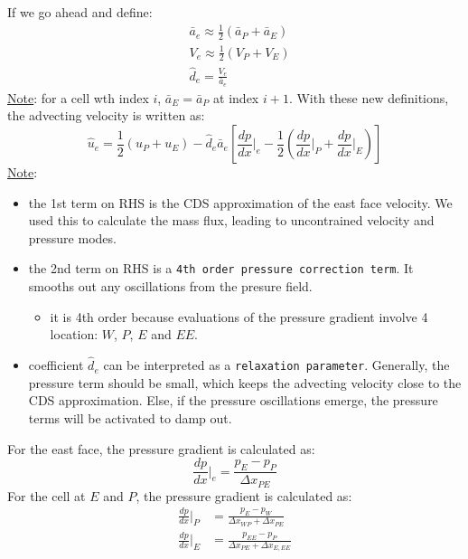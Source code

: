 \documentclass[11pt]{article}
\begin{document}
If we go ahead and define:
\begin{equation*}
\begin{aligned}
&\bar{a}_e \approx \frac{1}{2}(\bar{a}_P + \bar{a}_E)\\
&V_e \approx \frac{1}{2}(V_P + V_E)\\
& \hat{d}_e = \frac{V_e}{\bar{a}_e}
\end{aligned}
\end{equation*}
\uline{Note}: for a cell wth index \(i\), \(\bar{a}_E = \bar{a}_P\) at index \(i+1\). With these new definitions,
the advecting velocity is written as:
\begin{equation*}
\hat{u}_e = \frac{1}{2}(u_P + u_E)
- \hat{d}_e{\bar{a}_e}\left[ \frac{dp}{dx}\biggr\rvert_e -\frac{1}{2}
\left( \frac{dp}{dx}\biggr\rvert_P  + \frac{dp}{dx}\biggr\rvert_E  \right) \right]
\end{equation*}
\uline{Note}:
\begin{itemize}
\item the 1st term on RHS is the CDS approximation of the east face velocity. We used this to calculate the
mass flux, leading to uncontrained velocity and pressure modes.
\item the 2nd term on RHS is a \texttt{4th order pressure correction term}. It smooths out any oscillations from the
presure field. 
\begin{itemize}
\item it is 4th order because evaluations of the pressure gradient involve 4 location:
\(W\), \(P\), \(E\) and \(EE\).
\end{itemize}
\item coefficient \(\hat{d}_e\) can be interpreted as a \texttt{relaxation parameter}. Generally, the pressure term should be small,
which keeps the advecting velocity close to the CDS approximation. Else, if the pressure oscillations emerge, the
pressure terms will be activated to damp out.
\end{itemize}
For the east face, the pressure gradient is calculated as:
\begin{equation*}
\frac{dp}{dx}\biggr\rvert_e = \frac{p_E-p_P}{\Delta x_{PE}}
\end{equation*}
For the cell at \(E\) and \(P\), the pressure gradient is calculated as:
\begin{equation*}
\begin{aligned}
\frac{dp}{dx}\biggr\rvert_P &= \frac{p_E-p_W}{\Delta x_{WP}+\Delta x_{PE}}\\
\frac{dp}{dx}\biggr\rvert_E &= \frac{p_{EE}-p_P}{\Delta x_{PE}+\Delta x_{E,EE}}
\end{aligned}
\end{equation*}
\end{document}
